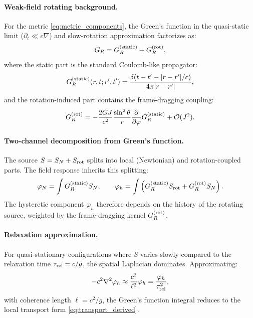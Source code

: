 \documentclass[11pt]{article}
\begin{document}
\paragraph{Weak-field rotating background.}
For the metric \eqref{eq:metric_components}, the Green's function in the quasi-static limit ($\partial_t \ll c\nabla$) and slow-rotation approximation factorizes as:
\begin{equation}
G_R = G_R^{\rm (static)} + G_R^{\rm (rot)},
\label{eq:greens_split}
\end{equation}
where the static part is the standard Coulomb-like propagator:
\begin{equation}
G_R^{\rm (static)}(r,t; r',t') = \frac{\delta(t-t'-|r-r'|/c)}{4\pi|r-r'|},
\label{eq:greens_static}
\end{equation}
and the rotation-induced part contains the frame-dragging coupling:
\begin{equation}
G_R^{\rm (rot)} = -\frac{2GJ}{c^2} \frac{\sin^2\theta}{r} \frac{\partial}{\partial\phi} G_R^{\rm (static)} + \mathcal{O}(J^2).
\label{eq:greens_rot}
\end{equation}

\paragraph{Two-channel decomposition from Green's function.}
The source $S = S_N + S_{\rm rot}$ splits into local (Newtonian) and rotation-coupled parts. The field response inherits this splitting:
\begin{equation}
\varphi_N = \int G_R^{\rm (static)} S_N, \qquad \varphi_h = \int \left(G_R^{\rm (static)} S_{\rm rot} + G_R^{\rm (rot)} S_N\right).
\label{eq:field_split}
\end{equation}
The hysteretic component $\varphi_h$ therefore depends on the history of the rotating source, weighted by the frame-dragging kernel $G_R^{\rm (rot)}$.

\paragraph{Relaxation approximation.}
For quasi-stationary configurations where $S$ varies slowly compared to the relaxation time $\tau_{\rm rel} = c/g$, the spatial Laplacian dominates. Approximating:
\begin{equation}
-c^2\nabla^2 \varphi_h \approx \frac{c^2}{\ell^2} \varphi_h = \frac{\varphi_h}{\tau_{\rm rel}^2},
\label{eq:laplacian_approx}
\end{equation}
with coherence length $\ell = c^2/g$, the Green's function integral reduces to the local transport form \eqref{eq:transport_derived}.
\end{document}
